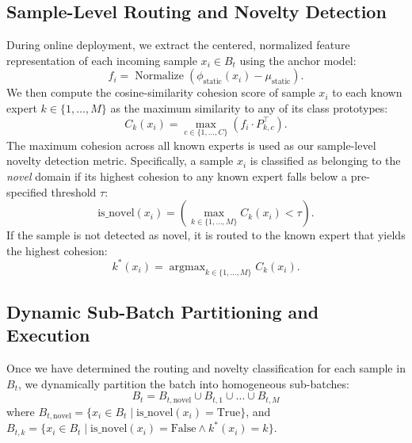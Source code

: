 \documentclass{article}
\theoremstyle{plain}
\theoremstyle{definition}
\theoremstyle{remark}
\begin{document}
\subsection{Sample-Level Routing and Novelty Detection}
During online deployment, we extract the centered, normalized feature representation of each incoming sample $x_i \in B_t$ using the anchor model:
\begin{equation}
    f_i = \operatorname{Normalize}\left( \phi_{\text{static}}(x_i) - \mu_{\text{static}} \right).
\end{equation}
We then compute the cosine-similarity cohesion score of sample $x_i$ to each known expert $k \in \{1, \dots, M\}$ as the maximum similarity to any of its class prototypes:
\begin{equation}
    C_k(x_i) = \max_{c \in \{1, \dots, C\}} \left( f_i \cdot P_{k, c}^\top \right).
\end{equation}
The maximum cohesion across all known experts is used as our sample-level novelty detection metric. Specifically, a sample $x_i$ is classified as belonging to the \textit{novel} domain if its highest cohesion to any known expert falls below a pre-specified threshold $\tau$:
\begin{equation}
    \text{is\_novel}(x_i) = \left( \max_{k \in \{1, \dots, M\}} C_k(x_i) < \tau \right).
\end{equation}
If the sample is not detected as novel, it is routed to the known expert that yields the highest cohesion:
\begin{equation}
    k^*(x_i) = \operatorname{argmax}_{k \in \{1, \dots, M\}} C_k(x_i).
\end{equation}

\subsection{Dynamic Sub-Batch Partitioning and Execution}
Once we have determined the routing and novelty classification for each sample in $B_t$, we dynamically partition the batch into homogeneous sub-batches:
\begin{equation}
    B_t = B_{t, \text{novel}} \cup B_{t, 1} \cup \dots \cup B_{t, M}
\end{equation}
where $B_{t, \text{novel}} = \{x_i \in B_t \mid \text{is\_novel}(x_i) = \text{True}\}$, and $B_{t, k} = \{x_i \in B_t \mid \text{is\_novel}(x_i) = \text{False} \land k^*(x_i) = k\}$.
\end{document}
